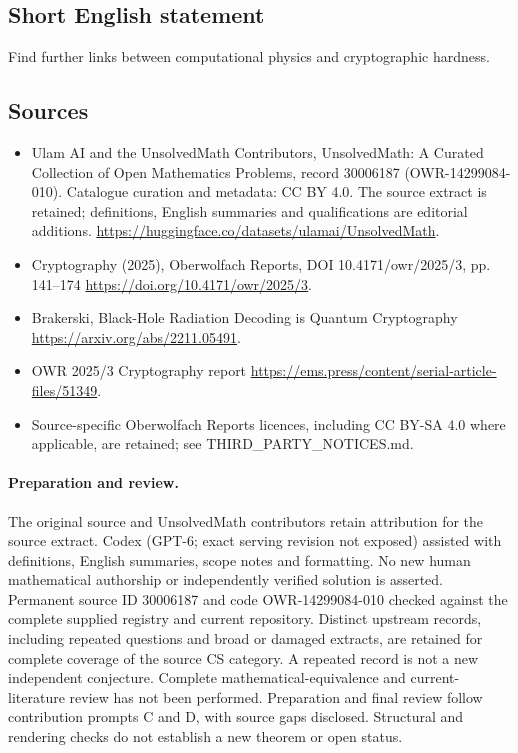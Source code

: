 \documentclass[11pt]{article}
\begin{document}
\subsection{Short English statement}
Find further links between computational physics and cryptographic hardness.
\subsection{Sources}
\begin{itemize}
\item[\hypertarget{source:30006187:1}{S1}] Ulam AI and the UnsolvedMath Contributors, UnsolvedMath: A Curated Collection of Open Mathematics Problems, record 30006187 (OWR-14299084-010). Catalogue curation and metadata: CC BY 4.0. The source extract is retained; definitions, English summaries and qualifications are editorial additions.
\url{https://huggingface.co/datasets/ulamai/UnsolvedMath}.
\item[\hypertarget{source:30006187:2}{S2}] Cryptography (2025), Oberwolfach Reports, DOI 10.4171/owr/2025/3, pp. 141--174
\url{https://doi.org/10.4171/owr/2025/3}.
\item[\hypertarget{source:30006187:3}{S3}] Brakerski, Black-Hole Radiation Decoding is Quantum Cryptography
\url{https://arxiv.org/abs/2211.05491}.
\item[\hypertarget{source:30006187:4}{S4}] OWR 2025/3 Cryptography report
\url{https://ems.press/content/serial-article-files/51349}.
\item Source-specific Oberwolfach Reports licences, including CC BY-SA 4.0 where applicable, are retained; see THIRD\_PARTY\_NOTICES.md.
\end{itemize}
\paragraph{Preparation and review.}
The original source and UnsolvedMath contributors retain attribution for the source extract. Codex (GPT-6; exact serving revision not exposed) assisted with definitions, English summaries, scope notes and formatting. No new human mathematical authorship or independently verified solution is asserted. Permanent source ID 30006187 and code OWR-14299084-010 checked against the complete supplied registry and current repository. Distinct upstream records, including repeated questions and broad or damaged extracts, are retained for complete coverage of the source CS category. A repeated record is not a new independent conjecture. Complete mathematical-equivalence and current-literature review has not been performed. Preparation and final review follow contribution prompts C and D, with source gaps disclosed. Structural and rendering checks do not establish a new theorem or open status.
\label{end:30006187}
\end{document}
